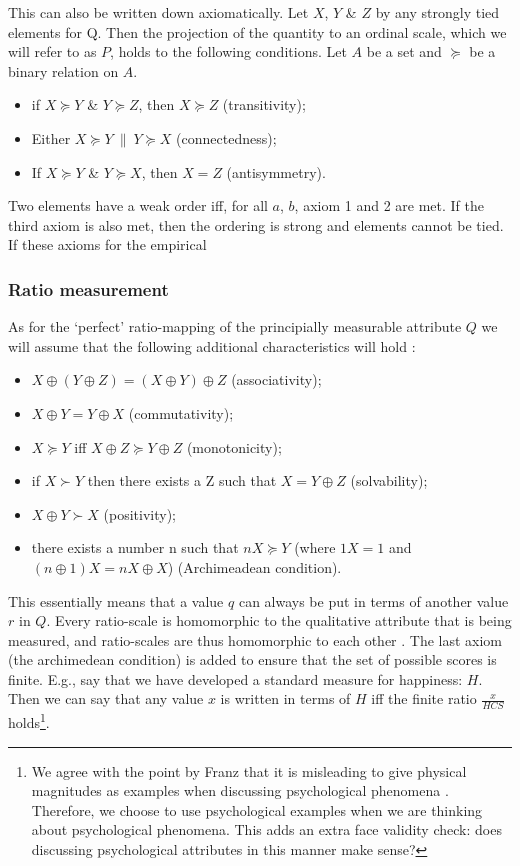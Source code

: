 \documentclass[utf8]{FrontiersinVancouver}
\begin{document}
This can also be written down axiomatically. Let $X$, $Y$ \& $Z$ by any strongly tied elements for Q. Then the projection of the quantity to an ordinal scale, which we will refer to as $P$, holds to the following conditions. Let $A$ be a set and $\succeq$ be a binary relation on $A$. 

\begin{itemize}
    \item if $X \succeq Y$ \& $Y \succeq Z$, then $X \succeq Z$ (transitivity);
    \item Either $X \succeq Y\ \|\ Y \succeq X$ (connectedness);
    \item If $X \succeq Y$ \& $Y \succeq X$, then $X = Z$ (antisymmetry).
\end{itemize}

Two elements have a weak order iff, for all $a$, $b$, axiom 1 and 2 are met. If the third axiom is also met, then the ordering is strong and elements cannot be tied. If these axioms for the empirical 

\subsubsection{Ratio measurement}
As for the `perfect' ratio-mapping of the principially measurable attribute $Q$ we will assume that the following additional characteristics will hold \citep{krantzFoundationsMeasurement1971}:

\begin{itemize}
    \item $X \oplus (Y \oplus Z) = (X \oplus Y) \oplus Z$ (associativity);
    \item $X \oplus Y = Y \oplus X$ (commutativity);
    \item $X \succeq Y$ iff $X \oplus Z \succeq Y \oplus Z$ (monotonicity);
    \item if $X \succ Y$ then there exists a Z such that $X = Y \oplus Z$ (solvability);
    \item $X \oplus Y \succ X$ (positivity);
    \item there exists a number n such that $nX \succeq Y$ (where $1X = 1$ and $(n \oplus 1) X = nX \oplus X$) (Archimeadean condition).
\end{itemize}

This essentially means that a value $q$ can always be put in terms of another value $r$ in $Q$. Every ratio-scale is homomorphic to the qualitative attribute that is being measured, and ratio-scales are thus homomorphic to each other \citep{michellAxiomsQuantityTheory1997}. The last axiom (the archimedean condition) is added to ensure that the set of possible scores is finite. E.g., say that we have developed a standard measure for happiness: $H$. Then we can say that any value $x$ is written in terms of $H$ iff the finite ratio $\frac{x}{HCS}$ holds\footnote{We agree with the point by Franz that it is misleading to give physical magnitudes as examples when discussing psychological phenomena \citep{franzArePsychologicalAttributes2022}. Therefore, we choose to use psychological examples when we are thinking about psychological phenomena. This adds an extra face validity check: does discussing psychological attributes in this manner make sense?}.
\end{document}
